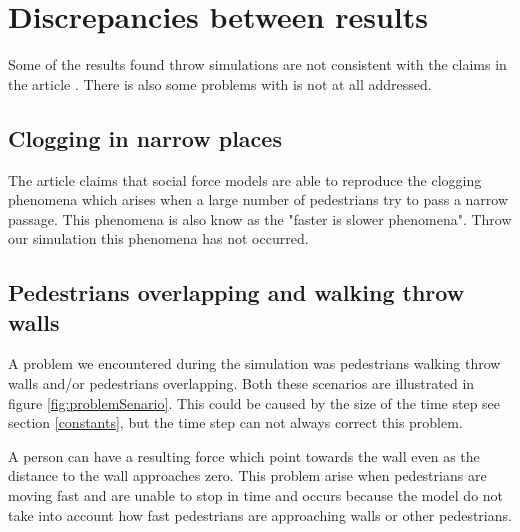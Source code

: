 \section{Discrepancies between results}
\label{sec:discrepancies}
Some of the results found throw simulations are not consistent with the claims in the article \cite{self-org}. There is also some problems with is not at all addressed.

\subsection{Clogging in narrow places}
The article \cite{self-org} claims that social force models are able to reproduce the clogging phenomena which arises when a large number of pedestrians try to pass a narrow passage. This phenomena is also know as the "faster is slower phenomena". Throw our simulation this phenomena has not occurred.



\subsection{Pedestrians overlapping and walking throw walls}
A problem we encountered during the simulation was pedestrians walking throw walls and/or pedestrians overlapping. Both these scenarios are illustrated in figure \ref{fig:problemSenario}. This could be caused by the size of the time step see section \ref{constants}, but the time step can not always correct this problem.

A person can have a resulting force which point towards the wall even as the distance to the wall approaches zero. This problem arise when pedestrians are moving fast and are unable to stop in time and occurs because the model do not take into account how fast pedestrians are approaching walls or other pedestrians.

